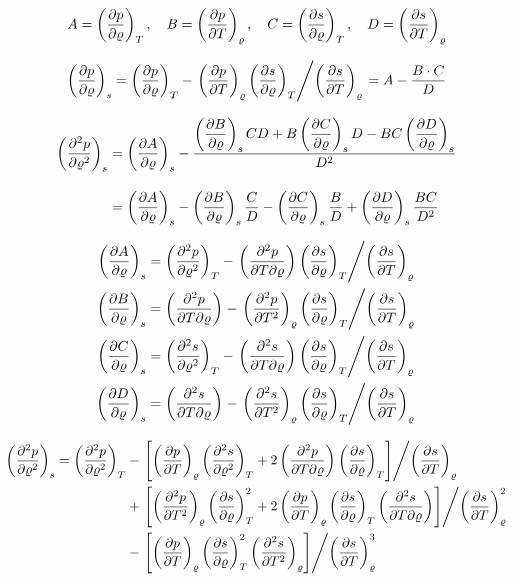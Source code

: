 \documentclass{article}
\begin{document}
\begin{equation}
A = \der{p}{\varrho}{T} ,\quad  
B  = \der{p}{T}{\varrho} ,\quad 
C  = \der{s}{\varrho}{T} ,\quad 
D  = \der{s}{T}{\varrho}
\end{equation}

\begin{equation}
\der{p}{\varrho}{s} = \der{p}{\varrho}{T}- \left. \der{p}{T}{\varrho}\der{s}{\varrho}{T} \middle/ \der{s}{T}{\varrho} \right. = A - \frac{B\cdot C}{D}
\end{equation}

\begin{align}
\der{^2p}{\varrho^2}{s} &= \der{A}{\varrho}{s} -\frac{\der{B}{\varrho}{s} C D + B \der{C}{\varrho}{s} D - B C \der{D}{\varrho}{s} }{D^2} 
\\[10pt] &= \der{A}{\varrho}{s} - \der{B}{\varrho}{s}\frac{C}{D} - \der{C}{\varrho}{s}\frac{B}{D} + \der{D}{\varrho}{s}\frac{BC}{D^2}
\end{align}

\begin{align}
\der{A}{\varrho}{s} &= \der{^2p}{\varrho^2}{T} - \left. \der{^2p}{T\partial\varrho}{} \der{s}{\varrho}{T} \middle/ \der{s}{T}{\varrho} \right. \\
\der{B}{\varrho}{s} &= \der{^2p}{T\partial\varrho}{} - \left. \der{^2p}{T^2}{\varrho} \der{s}{\varrho}{T} \middle/ \der{s}{T}{\varrho} \right. \\
\der{C}{\varrho}{s} &= \der{^2s}{\varrho^2}{T} - \left. \der{^2s}{T\partial\varrho}{} \der{s}{\varrho}{T} \middle/ \der{s}{T}{\varrho} \right. \\
\der{D}{\varrho}{s} &= \der{^2s}{T\partial\varrho}{} - \left. \der{^2s}{T^2}{\varrho} \der{s}{\varrho}{T} \middle/ \der{s}{T}{\varrho} \right. 
\end{align}

\begin{equation}
\begin{split}
\der{^2p}{\varrho^2}{s} = \der{^2p}{\varrho^2}{T} 
&- \left. \left[\der{p}{T}{\varrho} \der{^2s}{\varrho^2}{T} + 2 \der{^2p}{T\partial\varrho}{} \der{s}{\varrho}{T} \right] \middle/ \der{s}{T}{\varrho} \right. \\
&+ \left. \left[ \der{^2p}{T^2}{\varrho} \der{s}{\varrho}{T}^2 + 2 \der{p}{T}{\varrho} \der{s}{\varrho}{T} \der{^2s}{T\partial\varrho}{} \right] \middle/ \der{s}{T}{\varrho}^{2} \right. \\
&- \left. \left[ \der{p}{T}{\varrho} \der{s}{\varrho}{T}^2 \der{^2s}{T^2}{\varrho} \right] \middle/ \der{s}{T}{\varrho}^{3} \right.
\end{split}
\end{equation}
\end{document}
